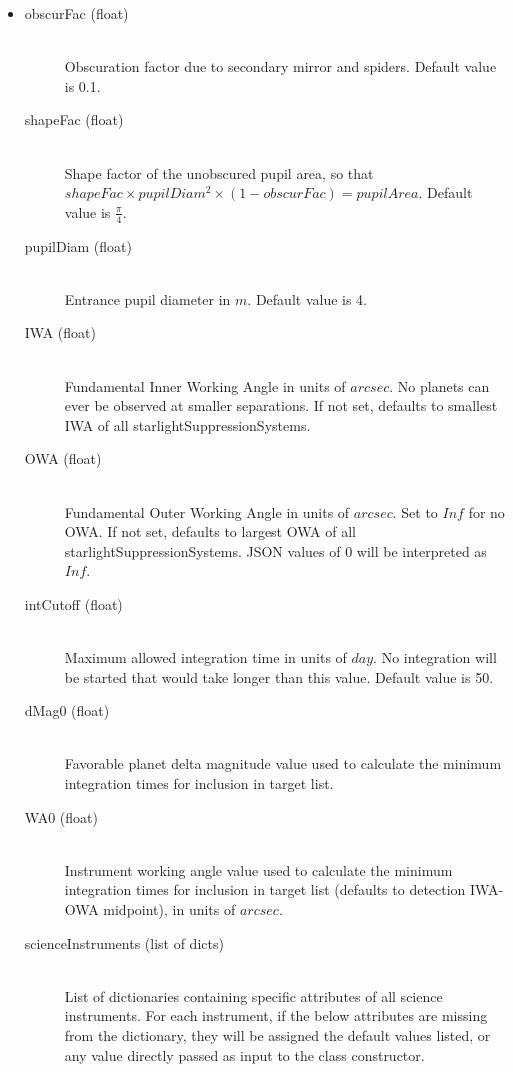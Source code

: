 \documentclass[cleanfoot]{asme2ej}
\begin{document}
\begin{itemize}
\item 
\begin{description}
    \item[obscurFac (float)] \hfill \\ Obscuration factor due to secondary mirror and spiders. Default value is 0.1.
    \item[shapeFac (float)] \hfill \\ Shape factor of the unobscured pupil area, so that $ shapeFac \times pupilDiam^2  \times (1-obscurFac) = pupilArea $. Default value is $ \frac{\pi}{4} $.
    \item[pupilDiam (float)] \hfill \\ Entrance pupil diameter in  $ m $. Default value is 4.
    \item[IWA (float)] \hfill \\ Fundamental Inner Working Angle in units of $ arcsec $. No planets can ever be observed at smaller separations. If not set, defaults to smallest IWA of all starlightSuppressionSystems.
    \item[OWA (float)] \hfill \\ Fundamental Outer Working Angle in units of $ arcsec $. Set to $ Inf $ for no OWA. If not set, defaults to largest OWA of all starlightSuppressionSystems. JSON values of 0 will be interpreted as $ Inf $.
    \item[intCutoff (float)] \hfill \\ Maximum allowed integration time in units of $ day $. No integration will be started that would take longer than this value. Default value is 50.
    \item[dMag0 (float)] \hfill \\  Favorable planet delta magnitude value used to calculate the minimum integration times for inclusion in target list.
    \item[WA0 (float)] \hfill \\  Instrument working angle value used to calculate the minimum integration times for inclusion in target list (defaults to detection IWA-OWA midpoint), in units of $arcsec$.
    \item[scienceInstruments (list of dicts)] \hfill\\ List of dictionaries containing specific attributes of all science instruments. For each instrument, if the below attributes are missing from the dictionary, they will be assigned the default values listed, or any value directly passed as input to the class constructor. 

\end{description}
\end{itemize}
\end{document}

